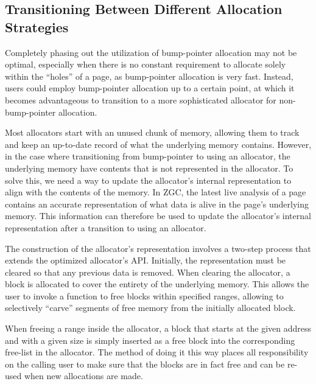 
\subsection{Transitioning Between Different Allocation Strategies}

Completely phasing out the utilization of bump-pointer allocation may not be optimal, especially when there is no constant requirement to allocate solely within the ``holes'' of a page, as bump-pointer allocation is very fast. Instead, users could employ bump-pointer allocation up to a certain point, at which it becomes advantageous to transition to a more sophisticated allocator for non-bump-pointer allocation.

Most allocators start with an unused chunk of memory, allowing them to track and keep an up-to-date record of what the underlying memory contains. However, in the case where transitioning from bump-pointer to using an allocator, the underlying memory have contents that is not represented in the allocator. To solve this, we need a way to update the allocator's internal representation to align with the contents of the memory. In ZGC, the latest live analysis of a page contains an accurate representation of what data is alive in the page's underlying memory. This information can therefore be used to update the allocator's internal representation after a transition to using an allocator.

The construction of the allocator's representation involves a two-step process that extends the optimized allocator's API. Initially, the representation must be cleared so that any previous data is removed. When clearing the allocator, a block is allocated to cover the entirety of the underlying memory. This allows the user to invoke a function to free blocks within specified ranges, allowing to selectively ``carve'' segments of free memory from the initially allocated block.

When freeing a range inside the allocator, a block that starts at the given address and with a given size is simply inserted as a free block into the corresponding free-list in the allocator. The method of doing it this way places all responsibility on the calling user to make sure that the blocks are in fact free and can be re-used when new allocations are made.

